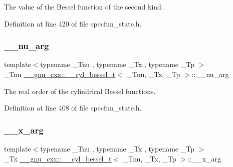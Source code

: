 The value of the Bessel function of the second kind. 



Definition at line 420 of file specfun\+\_\+state.\+h.

\mbox{\label{struct____gnu__cxx_1_1____cyl__bessel__t_a3d17d7f7196d7aef725228cf02269195}} 
\subsubsection{\texorpdfstring{\+\_\+\+\_\+nu\+\_\+arg}{\_\_nu\_arg}}
{\footnotesize\ttfamily template$<$typename \+\_\+\+Tnu , typename \+\_\+\+Tx , typename \+\_\+\+Tp $>$ \\
\+\_\+\+Tnu \hyperlink{struct____gnu__cxx_1_1____cyl__bessel__t}{\+\_\+\+\_\+gnu\+\_\+cxx\+::\+\_\+\+\_\+cyl\+\_\+bessel\+\_\+t}$<$ \+\_\+\+Tnu, \+\_\+\+Tx, \+\_\+\+Tp $>$\+::\+\_\+\+\_\+nu\+\_\+arg}



The real order of the cylindrical Bessel functions. 



Definition at line 408 of file specfun\+\_\+state.\+h.

\mbox{\label{struct____gnu__cxx_1_1____cyl__bessel__t_aac526f7bf86ebf0201e46545d9927f15}} 
\subsubsection{\texorpdfstring{\+\_\+\+\_\+x\+\_\+arg}{\_\_x\_arg}}
{\footnotesize\ttfamily template$<$typename \+\_\+\+Tnu , typename \+\_\+\+Tx , typename \+\_\+\+Tp $>$ \\
\+\_\+\+Tx \hyperlink{struct____gnu__cxx_1_1____cyl__bessel__t}{\+\_\+\+\_\+gnu\+\_\+cxx\+::\+\_\+\+\_\+cyl\+\_\+bessel\+\_\+t}$<$ \+\_\+\+Tnu, \+\_\+\+Tx, \+\_\+\+Tp $>$\+::\+\_\+\+\_\+x\+\_\+arg}




